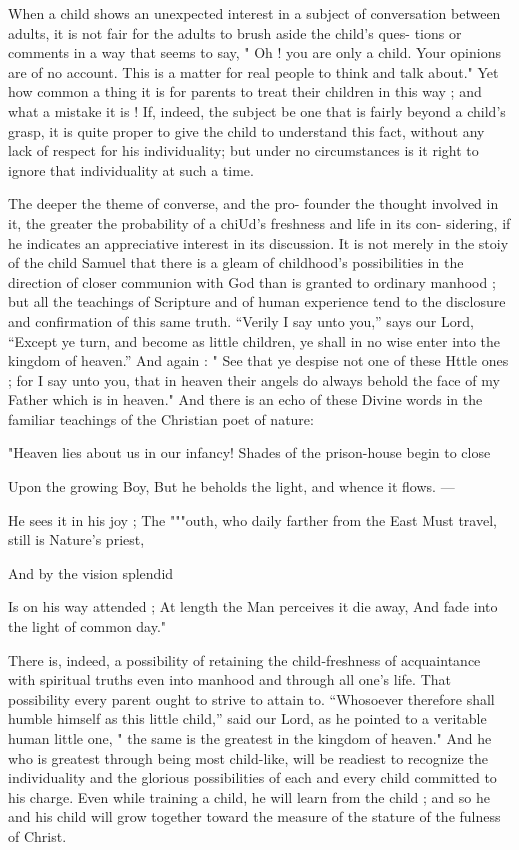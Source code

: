 \documentclass[
]{book}
\begin{document}
When a child shows an unexpected interest in a subject of conversation between adults, it is not fair for the adults to brush aside the child's ques- tions or comments in a way that seems to say, " Oh ! you are only a child. Your opinions are of no account. This is a matter for real people to think and talk about." Yet how common a thing it is for parents to treat their children in this way ; and what a mistake it is ! If, indeed, the subject be one that is fairly beyond a child's grasp, it is quite proper to give the child to understand this fact, without any lack of respect for his individuality; but under no circumstances is it right to ignore that individuality at such a time.

The deeper the theme of converse, and the pro- founder the thought involved in it, the greater the probability of a chiUd's freshness and life in its con- sidering, if he indicates an appreciative interest in its discussion. It is not merely in the stoiy of the child Samuel that there is a gleam of childhood's possibilities in the direction of closer communion with God than is granted to ordinary manhood ; but all the teachings of Scripture and of human experience tend to the disclosure and confirmation of this same truth. ``Verily I say unto you,'' says our Lord, ``Except ye turn, and become as little children, ye shall in no wise enter into the kingdom of heaven.'' And again : " See that ye despise not one of these Httle ones ; for I say unto you, that in heaven their angels do always behold the face of my Father which is in heaven." And there is an echo of these Divine words in the familiar teachings of the Christian poet of nature:

"Heaven lies about us in our infancy! Shades of the prison-house begin to close

Upon the growing Boy, But he beholds the light, and whence it flows. ---

He sees it in his joy ; The """outh, who daily farther from the East Must travel, still is Nature's priest,

And by the vision splendid

Is on his way attended ; At length the Man perceives it die away, And fade into the light of common day."

There is, indeed, a possibility of retaining the child-freshness of acquaintance with spiritual truths even into manhood and through all one's life. That possibility every parent ought to strive to attain to. ``Whosoever therefore shall humble himself as this little child,'' said our Lord, as he pointed to a veritable human little one, " the same is the greatest in the kingdom of heaven." And he who is greatest through being most child-like, will be readiest to recognize the individuality and the glorious possibilities of each and every child committed to his charge. Even while training a child, he will learn from the child ; and so he and his child will grow together toward the measure of the stature of the fulness of Christ.
\end{document}
